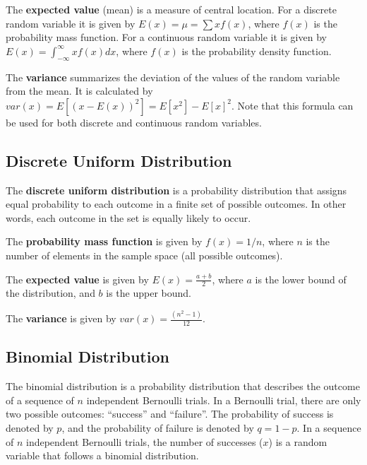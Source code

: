 \documentclass[
  letterpaper,
  DIV=11,
  numbers=noendperiod]{scrreprt}
\begin{document}
The \textbf{expected value} (mean) is a measure of central location. For
a discrete random variable it is given by \(E(x)=\mu=\sum xf(x)\), where
\(f(x)\) is the probability mass function. For a continuous random
variable it is given by \(E(x)= \int_{-\infty}^{\infty} x f(x) dx\),
where \(f(x)\) is the probability density function.

The \textbf{variance} summarizes the deviation of the values of the
random variable from the mean. It is calculated by
\(var(x)=E[(x-E(x))^2]=E[x^2]-E[x]^2\). Note that this formula can be
used for both discrete and continuous random variables.

\hypertarget{discrete-uniform-distribution}{%
\subsection*{Discrete Uniform
Distribution}\label{discrete-uniform-distribution}}

The \textbf{discrete uniform distribution} is a probability distribution
that assigns equal probability to each outcome in a finite set of
possible outcomes. In other words, each outcome in the set is equally
likely to occur.

The \textbf{probability mass function} is given by \(f(x)=1/n\), where
\(n\) is the number of elements in the sample space (all possible
outcomes).

The \textbf{expected value} is given by \(E(x)=\frac {a+b}{2}\), where
\(a\) is the lower bound of the distribution, and \(b\) is the upper
bound.

The \textbf{variance} is given by \(var(x)=\frac {(n^2-1)}{12}\).

\hypertarget{binomial-distribution}{%
\subsection*{Binomial Distribution}\label{binomial-distribution}}

The binomial distribution is a probability distribution that describes
the outcome of a sequence of \(n\) independent Bernoulli trials. In a
Bernoulli trial, there are only two possible outcomes: ``success'' and
``failure''. The probability of success is denoted by \(p\), and the
probability of failure is denoted by \(q = 1 - p\). In a sequence of
\(n\) independent Bernoulli trials, the number of successes (\(x\)) is a
random variable that follows a binomial distribution.
\end{document}
